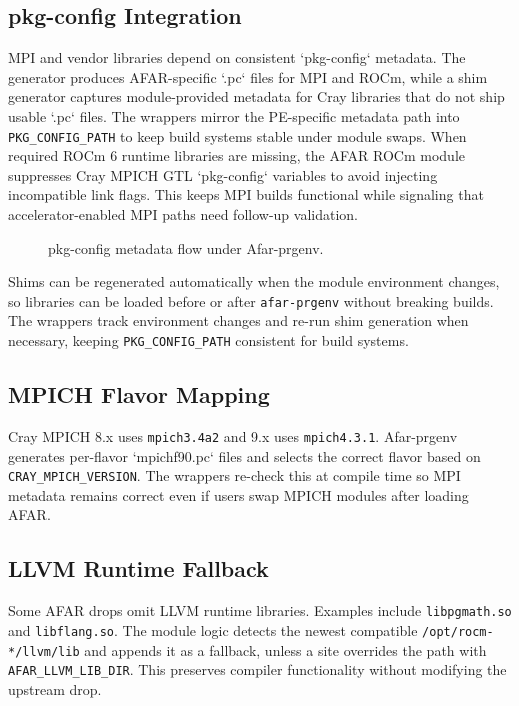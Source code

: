 \subsection{pkg-config Integration}
\label{sec:pkgconfig}
MPI and vendor libraries depend on consistent `pkg-config` metadata. The
generator produces AFAR-specific `.pc` files for MPI and ROCm, while a shim
generator captures module-provided metadata for Cray libraries that do not ship
usable `.pc` files. The wrappers mirror the PE-specific metadata path into
\texttt{PKG\_CONFIG\_PATH} to keep build systems stable under module swaps.
When required ROCm 6 runtime libraries are missing, the AFAR ROCm module
suppresses Cray MPICH GTL `pkg-config` variables to avoid injecting
incompatible link flags. This keeps MPI builds functional while signaling that
accelerator-enabled MPI paths need follow-up validation.

\begin{figure}[t]
  \centering
  \resizebox{\textwidth}{!}{}
  \caption{pkg-config metadata flow under Afar-prgenv.}
  \label{fig:pkgconfig-flow}
\end{figure}

Shims can be regenerated automatically when the module environment changes, so
libraries can be loaded before or after
\texttt{afar-}\allowbreak\texttt{prgenv} without breaking builds. The wrappers
track environment changes and re-run shim generation when necessary, keeping
\texttt{PKG\_}\allowbreak\texttt{CONFIG\_PATH} consistent for build systems.

\subsection{MPICH Flavor Mapping}
\label{sec:mpich-flavor}
Cray MPICH 8.x uses \texttt{mpich3.4a2} and 9.x uses \texttt{mpich4.3.1}.
Afar-prgenv generates per-flavor `mpichf90.pc` files and selects the correct
flavor based on
\texttt{CRAY\_MPICH\_VERSION}. The wrappers re-check this at compile time so MPI
metadata remains correct even if users swap MPICH modules after loading AFAR.

\subsection{LLVM Runtime Fallback}
\label{sec:llvm-runtime}
Some AFAR drops omit LLVM runtime libraries. Examples include
\texttt{libpgmath.so} and \texttt{libflang.so}. The module logic detects the newest compatible
\texttt{/opt/rocm-*/llvm/lib} and appends it as a fallback, unless a site
overrides the path with \texttt{AFAR\_LLVM\_LIB\_DIR}. This preserves compiler
functionality without modifying the upstream drop.

